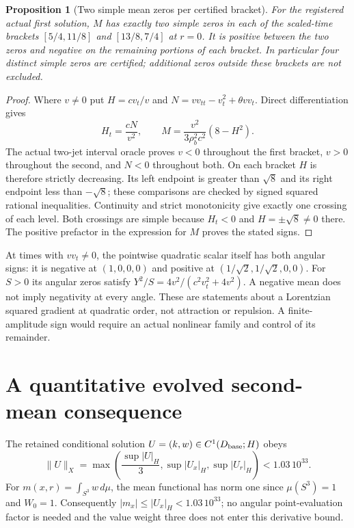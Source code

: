 \documentclass[11pt]{article}
\newtheorem{proposition}{Proposition}
\begin{document}
\begin{proposition}[Two simple mean zeros per certified bracket]
For the registered actual first solution, $M$ has exactly two simple zeros
in each of the scaled-time brackets $[5/4,11/8]$ and $[13/8,7/4]$ at $r=0$.
It is positive between the two zeros and negative on the remaining portions
of each bracket. In particular four distinct simple zeros are certified;
additional zeros outside these brackets are not excluded.
\end{proposition}
\begin{proof}
Where $v\ne0$ put $H=cv_t/v$ and
$N=vv_{tt}-v_t^2+\theta vv_t$. Direct differentiation gives
\begin{equation}
 H_t=\frac{cN}{v^2},\qquad
 M=\frac{v^2}{3\rho_b^2c^2}(8-H^2).
\end{equation}
The actual two-jet interval oracle proves $v<0$ throughout the first bracket,
$v>0$ throughout the second, and $N<0$ throughout both. On each bracket
$H$ is therefore strictly decreasing. Its left endpoint is greater than
$\sqrt8$ and its right endpoint less than $-\sqrt8$; these comparisons
are checked by signed squared rational inequalities. Continuity and strict
monotonicity give exactly one crossing of each level. Both crossings are
simple because $H_t<0$ and $H=\pm\sqrt8\ne0$ there. The positive prefactor
in the expression for $M$ proves the stated signs.
\end{proof}

At times with $vv_t\ne0$, the pointwise quadratic scalar itself has both
angular signs: it is negative at $(1,0,0,0)$ and positive at
$(1/\sqrt2,1/\sqrt2,0,0)$. For $S>0$ its angular zeros satisfy
$Y^2/S=4v^2/(c^2v_t^2+4v^2)$. A negative mean does not imply negativity
at every angle. These are statements about a Lorentzian squared gradient
at quadratic order, not attraction or repulsion. A finite-amplitude sign
would require an actual nonlinear family and control of its remainder.

\section{A quantitative evolved second-mean consequence}

The retained conditional solution $U=(k,w)\in C^1(D_{\rm base};H)$ obeys
\begin{equation}
 \|U\|_X=\max\left(\frac{\sup|U|_H}{3},
                         \sup|U_x|_H,\sup|U_r|_H\right)<1.03\,10^{33}.
\end{equation}
For $m(x,r)=\int_{S^3}w\,d\mu$, the mean functional has norm one since
$\mu(S^3)=1$ and $W_0=1$. Consequently
$|m_x|\le |U_x|_H<1.03\,10^{33}$; no angular point-evaluation factor is
needed and the value weight three does not enter this derivative bound.
\end{document}
